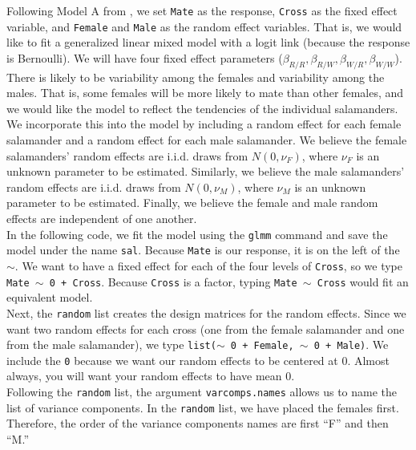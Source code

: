\documentclass[11pt]{article}\usepackage[]{graphicx}\usepackage[]{color}
\begin{document}
  Following Model A from \citet{karim:zeger:1992}, we set \texttt{Mate} as the response, \texttt{Cross} as the fixed effect variable, and \texttt{Female} and \texttt{Male} as the random effect variables. That is, we would like to fit a generalized linear mixed model with a logit link (because the response is Bernoulli). We will have four fixed effect parameters ($\beta_{R/R}, \beta_{R/W},\beta_{W/R},\beta_{W/W}$). There is likely to be variability among the females and variability among the males. That is, some females will be more likely to mate than other females, and we would like the model to reflect the tendencies of the individual salamanders. We incorporate this into the model by including a random effect for each female salamander and a random effect for each male salamander. We believe the female salamanders' random effects are i.i.d. draws from $N(0, \nu_F)$, where $\nu_F$ is an unknown parameter to be estimated. Similarly, we believe the male salamanders' random effects are i.i.d. draws from $N(0,\nu_M)$, where $\nu_M$ is an unknown parameter to be estimated. Finally, we believe the female and male random effects are independent of one another. \\




In the following code, we  fit the model using the \texttt{glmm} command and save the model under the name  \texttt{sal}. Because \texttt{Mate} is our response, it is on the left of the $\sim$. We want to have a fixed effect for each of the four levels of \texttt{Cross}, so we type \texttt{Mate $\sim$ 0 + Cross}. Because \texttt{Cross} is a factor, typing \texttt{Mate $\sim$ Cross} would fit an equivalent model. \\ 

Next, the \texttt{random} list creates the design matrices for the random effects. Since we want two random effects for each cross (one from the female salamander and one from the male salamander), we type \texttt{list($\sim$ 0 + Female, $\sim$ 0 + Male)}. We  include the \texttt{0} because we want our random effects to be centered at 0. Almost always, you will want your random effects to have mean 0. \\

 Following the \texttt{random} list, the argument \texttt{varcomps.names} allows us to name the list of variance components. In the \texttt{random} list, we have placed the females first. Therefore, the order of the variance components names are first ``F'' and then ``M.''  \\
\end{document}
